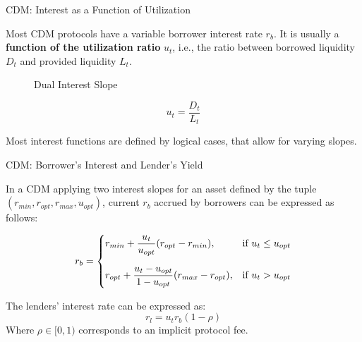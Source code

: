 \documentclass[handout]{beamer}
\begin{document}
\begin{frame}{CDM: Interest as a Function of Utilization }

Most CDM protocols have a variable borrower interest rate $r_b$. It is usually a \textbf{function of the utilization ratio} $u_t$, i.e., the ratio between borrowed liquidity $D_t$ and provided liquidity $L_t$.

\vspace{1.5em}

 {
\begin{minipage}{0.6\textwidth}
	\begin{figure}[t]
		\centering
		\begin{tikzpicture}[scale=0.5, every node/.style={scale=0.8}]
			
		\end{tikzpicture}
		\caption{Dual Interest Slope}
	\end{figure}
\end{minipage}
\begin{minipage}{0.38\textwidth}
	\vspace{-1em}
	\begin{equation*}
		u_t = \dfrac{D_t}{L_t}
	\end{equation*}
	
	\vspace{0.5 em}
	Most interest functions are defined by logical cases, that allow for varying slopes. 
	
\end{minipage}	
}

\end{frame}


\begin{frame}{CDM: Borrower's Interest and Lender's Yield }

In a CDM applying two interest slopes for an asset defined by the tuple $(r_{min}, r_{opt}, r_{max}, u_{opt})$, current $r_b$ accrued by borrowers can be expressed as follows:


\begin{equation*}
	r_b = 
		\begin{cases}
		r_{min} + \dfrac{u_t}{u_{opt}}(r_{opt}-r_{min}), & \text{if } u_t \leq u_{opt} \vspace{1em}\\
		r_{opt} + \dfrac{u_t-u_{opt}}{1-u_{opt}}(r_{max}-r_{opt}), & \text{if } u_t > u_{opt}
		\end{cases}
\end{equation*}

\vspace{1em}

 {
The lenders' interest rate can be expressed as:
%
\begin{equation*}
	r_l = u_t r_b (1-\rho) 
\end{equation*}
%
Where $\rho \in [0,1)$ corresponds to an implicit protocol fee.
}

\end{frame}
\end{document}
